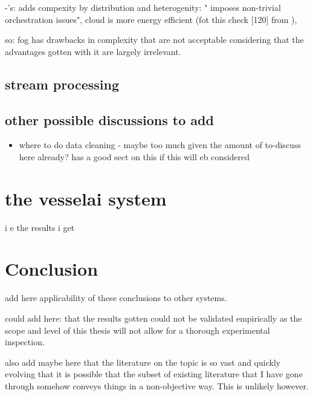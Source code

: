 -'s: adds compexity by distribution and heterogenity: " imposes non-trivial orchestration issues", cloud is more energy efficient (fot this check [120] from \cite{fogsurvey}),

so: fog has drawbacks in complexity that are not acceptable considering that the advantages gotten with it are largely irrelevant.


\section{stream processing}

\section{other possible discussions to add}

\begin{itemize}
    \item where to do data cleaning - maybe too much given the amount of to-discuss here already? \cite{mlforstreamingsurvey} has a good sect on this if this will eb considered
\end{itemize}

\chapter{the vesselai system}

i e the results i get

\chapter{Conclusion}

add here applicability of these conclusions to other systems.

could add here: that the results gotten could not be validated empirically as the scope and level of this thesis will not allow for a thorough experimental inspection.

also add maybe here that the literature on the topic is so vast and quickly evolving that it is possible that the subset of existing literature that I have gone through somehow conveys things in a non-objective way. This is unlikely however.
